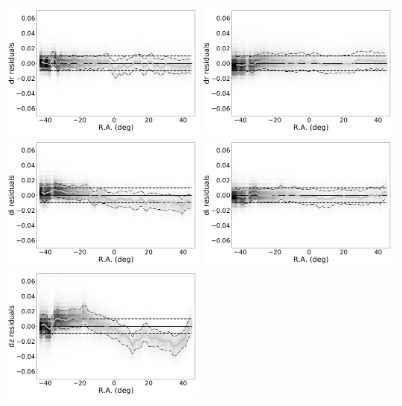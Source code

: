 \documentclass[fleqn,usenatbib]{mnras}
\begin{document}
\begin{figure}
    \centering\includegraphics[width=0.45\textwidth]{figures/colorResidDES42bright_dr_RA_Hess.png}
    \centering\includegraphics[width=0.45\textwidth]{figures/colorResidPSDR2v42bright_dr_RA_Hess.png}
    \centering\includegraphics[width=0.45\textwidth]{figures/colorResidDES42bright_di_RA_Hess.png}
    \centering\includegraphics[width=0.45\textwidth]{figures/colorResidPSDR2v42bright_di_RA_Hess.png}
    \centering\includegraphics[width=0.45\textwidth]{figures/colorResidDES42bright_dz_RA_Hess.png}

\end{figure}
\end{document}
